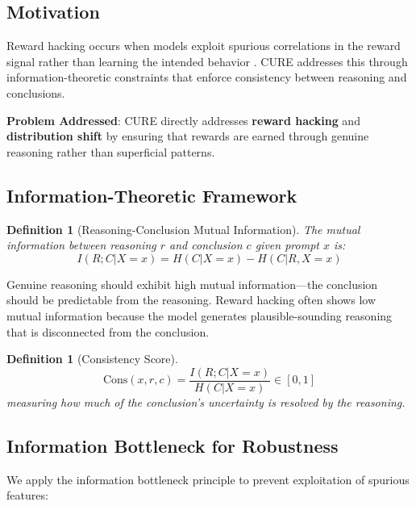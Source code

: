 \documentclass[11pt,a4paper]{article}
\newtheorem{definition}[theorem]{Definition}
\begin{document}
\subsection{Motivation}

Reward hacking occurs when models exploit spurious correlations in the reward signal rather than learning the intended behavior \citep{skalse2022defining}. CURE addresses this through information-theoretic constraints that enforce consistency between reasoning and conclusions.

\textbf{Problem Addressed}: CURE directly addresses \textbf{reward hacking} and \textbf{distribution shift} by ensuring that rewards are earned through genuine reasoning rather than superficial patterns.

\subsection{Information-Theoretic Framework}

\begin{definition}[Reasoning-Conclusion Mutual Information]
The mutual information between reasoning $r$ and conclusion $c$ given prompt $x$ is:
\begin{equation}
    I(R; C | X=x) = H(C|X=x) - H(C|R, X=x)
\end{equation}
\end{definition}

Genuine reasoning should exhibit high mutual information---the conclusion should be predictable from the reasoning. Reward hacking often shows low mutual information because the model generates plausible-sounding reasoning that is disconnected from the conclusion.

\begin{definition}[Consistency Score]
\begin{equation}
    \text{Cons}(x, r, c) = \frac{I(R; C | X=x)}{H(C|X=x)} \in [0, 1]
\end{equation}
measuring how much of the conclusion's uncertainty is resolved by the reasoning.
\end{definition}

\subsection{Information Bottleneck for Robustness}

We apply the information bottleneck principle to prevent exploitation of spurious features:
\end{document}

